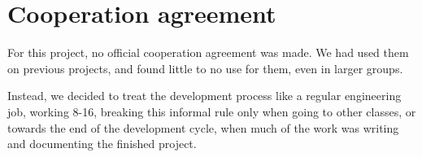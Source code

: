 \chapter{Cooperation agreement}
For this project, no official cooperation agreement was made. We had used them on previous projects, and found little to no use for them, even in larger groups. 

Instead, we decided to treat the development process like a regular engineering job, working 8-16, breaking this informal rule only when going to other classes, or towards the end of the development cycle, when much of the work was writing and documenting the finished project. 